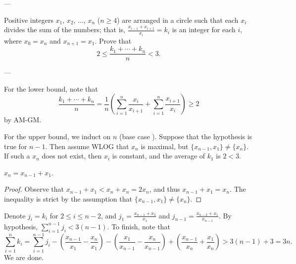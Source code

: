
---

Positive integers $x_1$, $x_2$, $\ldots$, $x_n$ ($n\ge4$) are arranged in a circle such that each $x_i$ divides the sum of the numbers; that is, $\frac{x_{i-1}+x_{i+1}}{x_i}=k_i$ is an integer for each $i$, where $x_0=x_n$ and $x_{n+1}=x_1$. Prove that \[2\le\frac{k_1+\cdots+k_n}n<3.\]

---

For the lower bound, note that \[\frac{k_1+\cdots+k_n}n=\frac1n\left(\sum_{i=1}^n\frac{x_i}{x_{i+1}}+\sum_{i=1}^n\frac{x_{i+1}}{x_i}\right)\ge2\]
by AM-GM.

For the upper bound, we induct on $n$ (base case ). Suppose that the hypothesis is true for $n-1$. Then assume WLOG that $x_n$ is maximal, but $\{x_{n-1},x_1\}\ne\{x_n\}$. If such a $x_n$ does not exist, then $x_i$ is constant, and the average of $k_1$ is $2<3$.
\begin{iclaim*}
    $x_n=x_{n-1}+x_1$.
\end{iclaim*}
\begin{proof}
    Observe that $x_{n-1}+x_1<x_n+x_n=2x_n$, and thus $x_{n-1}+x_1=x_n$. The inequality is strict by the assumption that $\{x_{n-1},x_1\}\ne\{x_n\}$.
\end{proof}

Denote $j_i=k_i$ for $2\le i\le n-2$, and $j_1=\frac{x_{n-1}+x_2}{x_1}$ and $j_{n-1}=\frac{x_{n-2}+x_1}{x_{n-1}}$. By hypothesis, $\sum_{i=1}^{n-1}j_i<3(n-1)$. To finish, note that \[\sum_{i=1}^nk_i=\sum_{i=1}^{n-1}j_i-\left(\frac{x_{n-1}}{x_1}-\frac{x_n}{x_1}\right)-\left(\frac{x_1}{x_{n-1}}-\frac{x_n}{x_{n-1}}\right)+\left(\frac{x_{n-1}}{x_n}+\frac{x_1}{x_n}\right)>3(n-1)+3=3n.\]
We are done.

